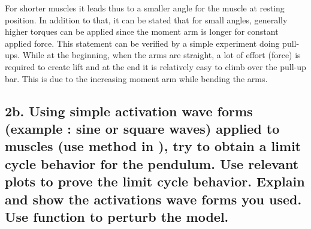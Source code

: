 \documentclass{cmc}
\begin{document}
For shorter muscles it leads thus to a smaller angle for the muscle at resting position. In addition to that, it can be stated that for small angles, generally higher torques can be applied since the moment arm is longer for constant applied force. This statement can be verified by a simple experiment doing pull-ups. While at the beginning, when the arms are straight, a lot of effort (force) is required to create lift and at the end it is relatively easy to climb over the pull-up bar. This is due to the increasing moment arm while bending the arms.


\clearpage

\subsection*{2b. Using simple activation wave forms (example : sine or
  square waves) applied to muscles (use
   method in
  ), try to obtain a limit cycle behavior for
  the pendulum. Use relevant plots to prove the limit cycle behavior.
  Explain and show the activations wave forms you used. Use
  \newline {} function to perturb the model.}
\label{sec:2c}
\end{document}
